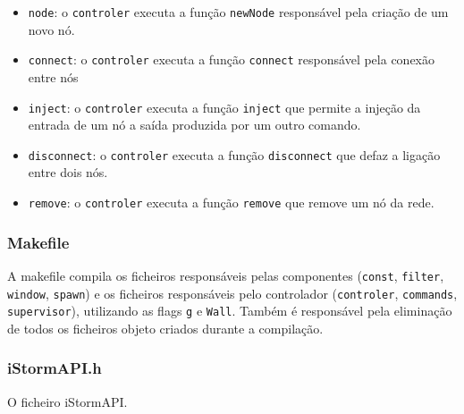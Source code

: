 \documentclass[12pt]{article}
\begin{document}
\begin{itemize}
\item \texttt{node}: o \texttt{controler} executa a função \texttt{newNode} responsável pela criação de um novo nó.
\item \texttt{connect}: o \texttt{controler} executa a função \texttt{connect} responsável pela conexão entre nós
\item \texttt{inject}: o \texttt{controler} executa a função \texttt{inject} que permite a injeção da entrada de um nó a saída produzida por um outro comando.
\item \texttt{disconnect}: o \texttt{controler} executa a função \texttt{disconnect} que defaz a ligação entre dois nós.
\item \texttt{remove}: o \texttt{controler} executa a função \texttt{remove} que remove um nó da rede.
\end{itemize}




\subsubsection{Makefile}
A makefile compila os ficheiros responsáveis pelas componentes (\texttt{const},  \texttt{filter}, \texttt{window}, \texttt{spawn}) e os ficheiros responsáveis pelo controlador (\texttt{controler}, \texttt{commands}, \texttt{supervisor}), utilizando as flags \texttt{g} e \texttt{Wall}. Também é responsável pela eliminação de todos os ficheiros objeto criados durante a compilação.

\subsubsection{iStormAPI.h}
O ficheiro iStormAPI.
\end{document}
